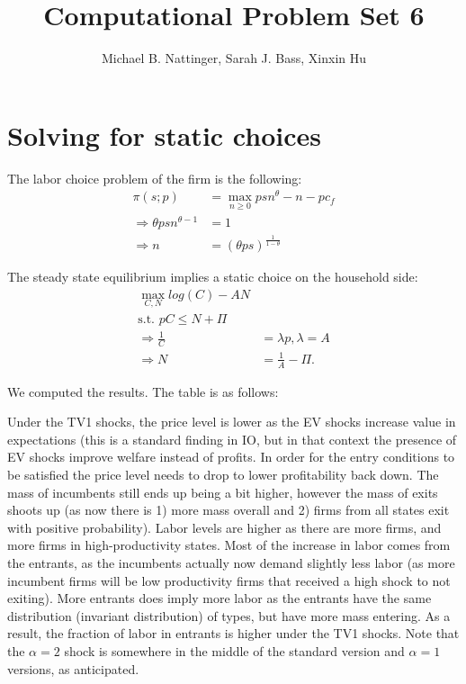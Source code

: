 \documentclass[11pt]{article} %
\title{Computational Problem Set 6}
\author{Michael B. Nattinger, Sarah J. Bass, Xinxin Hu}
\begin{document}
\maketitle
\section{Solving for static choices}
The labor choice problem of the firm is the following: 
\begin{align*}
\pi(s;p) &= \max_{n\geq 0} psn^{\theta} - n - pc_f\\
\Rightarrow \theta psn^{\theta - 1} &= 1\\
\Rightarrow n &= (\theta p s)^{\frac{1}{1-\theta }} 
\end{align*}

The steady state equilibrium implies a static choice on the household side:
\begin{align*}
\max_{C,N} log(C) - AN \\
\text{s.t. } pC\leq N + \Pi \\
\Rightarrow \frac{1}{C} &= \lambda p, \lambda = A\\
\Rightarrow N &= \frac{1}{A} - \Pi.
\end{align*}

We computed the results. The table is as follows:

\begin{center}

\end{center}

Under the TV1 shocks, the price level is lower as the EV shocks increase value in expectations (this is a standard finding in IO, but in that context the presence of EV shocks improve welfare instead of profits. In order for the entry conditions to be satisfied the price level needs to drop to lower profitability back down. The mass of incumbents still ends up being a bit higher, however the mass of exits shoots up (as now there is 1) more mass overall and 2) firms from all states exit with positive probability). Labor levels are higher as there are more firms, and more firms in high-productivity states. Most of the increase in labor comes from the entrants, as the incumbents actually now demand slightly less labor (as more incumbent firms will be low productivity firms that received a high shock to not exiting). More entrants does imply more labor as the entrants have the same distribution (invariant distribution) of types, but have more mass entering. As a result, the fraction of labor in entrants is higher under the TV1 shocks. Note that the $\alpha = 2$ shock is somewhere in the middle of the standard version and $\alpha = 1$ versions, as anticipated.
\end{document}
